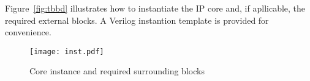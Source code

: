 Figure~\ref{fig:tbbd} illustrates how to instantiate the IP core and, if
apllicable, the required external blocks. A Verilog instantion template is
provided for convenience.

\begin{figure}[!htbp]
    \centerline{\texttt{[image: inst.pdf]}}
    \vspace{0cm}\caption{Core instance and required surrounding blocks}
    \label{fig:inst}
\end{figure}



